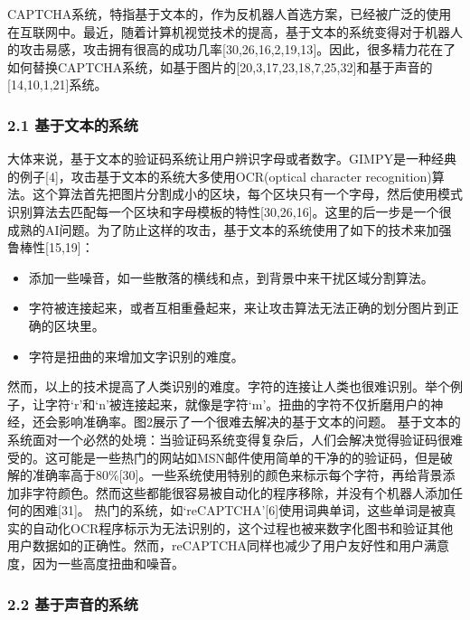 CAPTCHA系统，特指基于文本的，作为反机器人首选方案，已经被广泛的使用在互联网中。最近，随着计算机视觉技术的提高，基于文本的系统变得对于机器人的攻击易感，攻击拥有很高的成功几率{[}30,26,16,2,19,13{]}。因此，很多精力花在了如何替换CAPTCHA系统，如基于图片的{[}20,3,17,23,18,7,25,32{]}和基于声音的{[}14,10,1,21{]}系统。

\subsubsection{2.1
基于文本的系统}\label{ux57faux4e8eux6587ux672cux7684ux7cfbux7edf}

大体来说，基于文本的验证码系统让用户辨识字母或者数字。GIMPY是一种经典的例子{[}4{]}，攻击基于文本的系统大多使用OCR(optical
character
recognition)算法。这个算法首先把图片分割成小的区块，每个区块只有一个字母，然后使用模式识别算法去匹配每一个区块和字母模板的特性{[}30,26,16{]}。这里的后一步是一个很成熟的AI问题。为了防止这样的攻击，基于文本的系统使用了如下的技术来加强鲁棒性{[}15,19{]}：

\begin{itemize}
\tightlist
\item
  添加一些噪音，如一些散落的横线和点，到背景中来干扰区域分割算法。
\item
  字符被连接起来，或者互相重叠起来，来让攻击算法无法正确的划分图片到正确的区块里。
\item
  字符是扭曲的来增加文字识别的难度。
\end{itemize}

然而，以上的技术提高了人类识别的难度。字符的连接让人类也很难识别。举个例子，让字符`r'和`n'被连接起来，就像是字符`m'。扭曲的字符不仅折磨用户的神经，还会影响准确率。图2展示了一个很难去解决的基于文本的问题。
基于文本的系统面对一个必然的处境：当验证码系统变得复杂后，人们会解决觉得验证码很难受的。这可能是一些热门的网站如MSN邮件使用简单的干净的的验证码，但是破解的准确率高于80\%{[}30{]}。一些系统使用特别的颜色来标示每个字符，再给背景添加非字符颜色。然而这些都能很容易被自动化的程序移除，并没有个机器人添加任何的困难{[}31{]}。
热门的系统，如`reCAPTCHA'{[}6{]}使用词典单词，这些单词是被真实的自动化OCR程序标示为无法识别的，这个过程也被来数字化图书和验证其他用户数据如的正确性。然而，reCAPTCHA同样也减少了用户友好性和用户满意度，因为一些高度扭曲和噪音。

\subsubsection{2.2
基于声音的系统}\label{ux57faux4e8eux58f0ux97f3ux7684ux7cfbux7edf}

